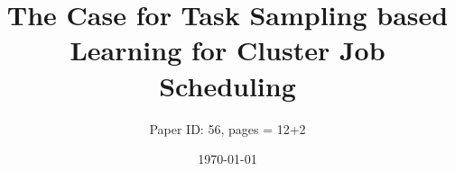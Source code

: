 \documentclass[sigplan, 10pt]{acmart}
\begin{document}
\title{The Case for Task Sampling based Learning for Cluster Job Scheduling
 }
\author{
\xspace
Paper ID: 56, pages = 12+2\\
\date{\today}
} %

\newcommand{\oldstuff}[1]{}
\newcommand{\yes}{$\checkmark$}
\newcommand{\limited}{Limited}
\newcommand{\no}{$\times$}
\newcommand{\etc}{\emph{etc.}\xspace}
\newcommand{\etcc}{\emph{etc.}}
\newcommand{\ie}{\emph{i.e.,}\xspace}
\newcommand{\eg}{\emph{e.g.,}\xspace}
\newcommand{\etal}{\emph{et al.}\xspace}
\newcommand{\SmallCrunch}{\vspace{-0cm}}
\newcommand{\smallcrunch}{\vspace{-0cm}}

\renewcommand{\paragraph}[1]{\smallskip\noindent{\bf{#1}}}

\renewcommand{\comment}[1]{{\it #1}}
\renewcommand{\rm}[1]{{}}



\newcommand{\deadlineCS}[1]{{\color{red} #1}}
\newcommand{\soccReviewEdit}[2]{{\color{red} \textit{socc19 (Reviewer - #1): }#2}}
\newcommand{\commentlinx}[1]{{\it \textit{linx: #1}}}
\newcommand{\commentaj}[1]{{\it \textit{aj: #1}}}
\newcommand{\questionaj}[1]{{\it \textbf{questionAJ: #1}}}
\newcommand{\updated}[1]{{\it {Updated: #1}}}
\newcommand{\editaj}[2]{{\sout{#1}\it {#2}}}
\newcommand{\removeajbcoz}[2]{{\color{red}{\textbf{Remove following:}}}{\sout{#1}}{\color{red} {\textbf{ - Because} #2}}}
\newcommand{\removeaj}[1]{{\color{red}{\sout{#1}}}}
\newcommand{\addaj}[1]{{\it {ADD?: #1}}}
\newcommand{\addajbcoz}[2]{{\it {ADD?: #1} \textit{\textbf{ - } #2}}}
\newcommand{\todoaj}[1]{{\it \textit{TODO(AJ): #1}}}
\end{document}
